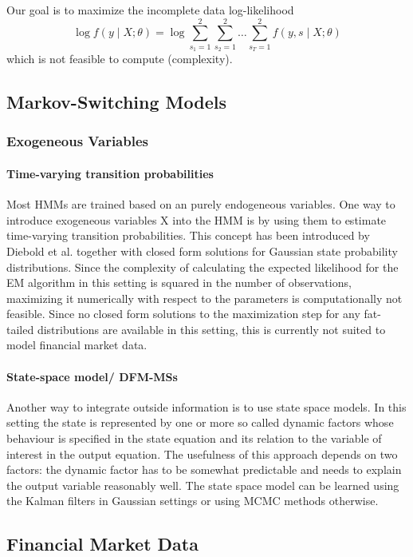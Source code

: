 \documentclass[11pt,a4paper]{article}
\begin{document}
Our goal is to maximize the incomplete data log-likelihood 
$$\log f(y \mid X ; \theta)=\log \sum_{s_{1}=1}^{2} \sum_{s_{2}=1}^{2} \ldots \sum_{s_{T}=1}^{2} f(y, s \mid X ; \theta)$$ which is not feasible to compute (complexity).

\subsection{Markov-Switching Models}

\subsubsection{Exogeneous Variables}
\paragraph{Time-varying transition probabilities}
Most HMMs are trained based on an purely endogeneous variables. One way to introduce exogeneous variables X into the HMM is by using them to estimate time-varying transition probabilities. This concept has been introduced by Diebold et al. \cite{diebold_regime_1993} together with closed form solutions for Gaussian state probability distributions. Since the complexity of calculating the expected likelihood for the EM algorithm in this setting is squared in the number of observations, maximizing it numerically with respect to the parameters is computationally not feasible. Since no closed form solutions to the maximization step for any fat-tailed distributions are available in this setting, this is currently not suited to model financial market data.

\paragraph{State-space model/ DFM-MSs}
Another way to integrate outside information is to use state space models. In this setting the state is represented by one or more so called dynamic factors whose behaviour is specified in the state equation and its relation to the variable of interest in the output equation. The usefulness of this approach depends on two factors: the dynamic factor has to be somewhat predictable and 
needs to explain the output variable reasonably well. The state space model can be learned using the Kalman filters in Gaussian settings or using MCMC methods otherwise.

\subsection{Financial Market Data}
\end{document}
